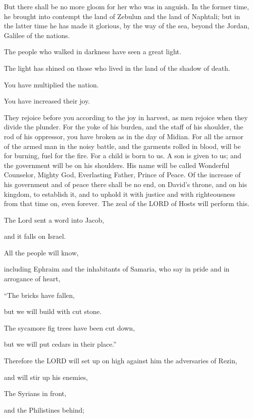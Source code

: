 \mychapter{} \myverse*{}But there shall be no more gloom for her who was in anguish. In
the former time, he brought into contempt the land of Zebulun and the land of Naphtali; but in the latter
time he has made it glorious, by the way of the sea, beyond the Jordan, Galilee of the nations.

\myverse{}The people who walked in darkness have seen a great light.

The light has shined on those who lived in the land of the shadow of death.

\myverse{}You have multiplied the nation.

You have increased their joy.

They rejoice before you according to the joy in harvest, as men rejoice when they divide
the plunder.
\myverse{}For the yoke of his burden, and the staff of his shoulder, the rod of his oppressor,
you have broken as in the day of Midian.
\myverse{}For all the armor of the armed man in the noisy battle, and the garments rolled
in blood, will be for burning, fuel for the fire.
\myverse{}For a child is born to us. A son is given to us; and the government will be
on his shoulders. His name will be called Wonderful Counselor, Mighty God, Everlasting Father, Prince
of Peace.
\myverse{}Of the increase of his government and of peace there shall be no end, on David’s
throne, and on his kingdom, to establish it, and to uphold it with justice and with righteousness from
that time on, even forever. The zeal of the LORD of Hosts will perform this.

\myverse{}The Lord sent a word into Jacob,

and it falls on Israel.

\myverse{}All the people will know,

including Ephraim and the inhabitants of Samaria, who say in pride and in arrogance
of heart,

\myverse{}“The bricks have fallen,

but we will build with cut stone.

The sycamore fig trees have been cut down,

but we will put cedars in their place.”

\myverse{}Therefore the LORD will set up on high against him the adversaries
of Rezin,

and will stir up his enemies,

\myverse{}The Syrians in front,

and the Philistines behind;

